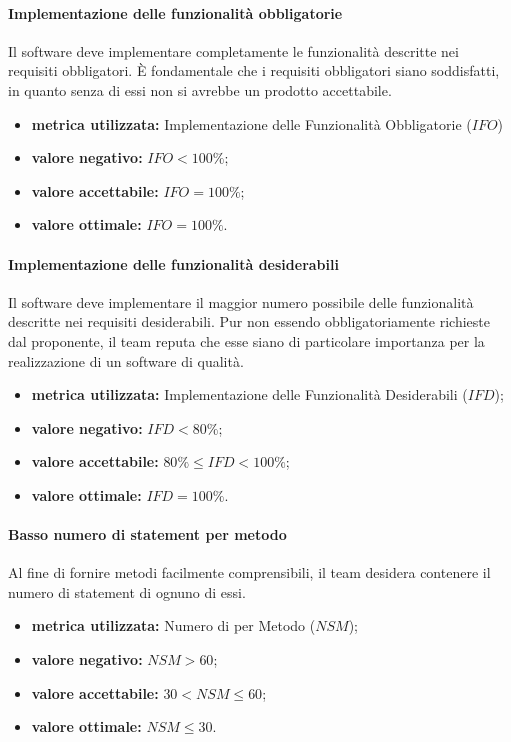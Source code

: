 		\paragraph{Implementazione delle funzionalità obbligatorie}
			\label{OIDFO}
			Il software deve implementare completamente le funzionalità descritte nei requisiti obbligatori. È fondamentale che i requisiti obbligatori siano soddisfatti, in quanto senza di essi non si avrebbe un prodotto accettabile.
			\begin{itemize}
				\item \textbf{metrica utilizzata:} Implementazione delle Funzionalità Obbligatorie ($IFO$)
				\item \textbf{valore negativo:} $IFO<100\%$;
				\item \textbf{valore accettabile:} $IFO=100\%$;
				\item \textbf{valore ottimale:} $IFO=100\%$.
			\end{itemize}

		\paragraph{Implementazione delle funzionalità desiderabili}
		\label{OIDFD}
		Il software deve implementare il maggior numero possibile delle funzionalità descritte nei requisiti desiderabili. Pur non essendo obbligatoriamente richieste dal proponente, il team reputa che esse siano di particolare importanza per la realizzazione di un software di qualità.
		\begin{itemize}
			\item \textbf{metrica utilizzata:} Implementazione delle Funzionalità Desiderabili ($IFD$);
			\item \textbf{valore negativo:} $IFD<80\%$;
			\item \textbf{valore accettabile:} $80\% \leq IFD <100\%$;
			\item \textbf{valore ottimale:} $IFD=100\%$.
		\end{itemize}

		\paragraph{Basso numero di statement per metodo}
			\label{OBNDSPM}
			Al fine di fornire metodi facilmente comprensibili, il team desidera contenere il numero di statement di ognuno di essi.
			\begin{itemize}
				\item \textbf{metrica utilizzata:} Numero di  per Metodo ($NSM$);
				\item \textbf{valore negativo:} $NSM>60$;
				\item \textbf{valore accettabile:} $30< NSM\leq 60$;
				\item \textbf{valore ottimale:} $NSM\leq 30$.
			\end{itemize}
			
